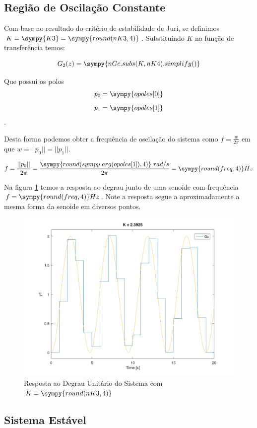 \documentclass[a4paper,11pt]{article}
\newcommand{\npy}[1]{\sympy{round(#1,4)}}
\begin{document}
\subsection{Região de Oscilação Constante}

Com base no resultado do critério de estabilidade de Juri, se definimos $K = \sympy{K3}= \npy{nK3}$. Substituindo $K$ na função de transferência temos:

\begin{equation}\label{eq:closedloop-sys-oscilation}
    G_{2}(z) = \sympy{nGc.subs(K,nK4).simplify()}
\end{equation}

Que possui os polos 
$$p_0 = \sympy{opoles[0]}$$
$$p_1 = \sympy{opoles[1]}$$.

Desta forma podemos obter a frequência de oscilação do sistema como $f = \frac{w}{2\pi}$ em que $w = ||p_0|| = ||p_1||$.

$$f = \frac{||p_0||}{2\pi} = \frac{\npy{sympy.arg(opoles[1])}\ rad/s}{2\pi} = \npy{freq} Hz$$

Na figura \ref{fig:ex1-plot-oscilation} temos a resposta ao degrau junto de uma senoide com frequência $f = \npy{freq} Hz$. Note a resposta segue a aproximadamente a mesma forma da senoide em diversos pontos.

\begin{figure}[H]
    \label{fig:ex1-plot-oscilation}
    \centering
    \includegraphics[width=0.9\linewidth]{img/exsim1-plot-oscilation.png}
    \caption{Resposta ao Degrau Unitário do Sistema com $K = \npy{nK3}$}
\end{figure}

\subsection{Sistema Estável}
\end{document}

